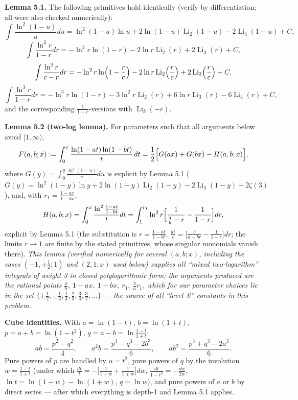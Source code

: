 \documentclass[11pt]{article}
\theoremstyle{remark}
\begin{document}
\textbf{Lemma 5.1.} The following primitives hold identically (verify by differentiation; all were also checked numerically):
\[
\int\frac{\ln^2(1-u)}{u}du=\ln^2(1-u)\ln u+2\ln(1-u)\operatorname{Li}_2(1-u)-2\operatorname{Li}_3(1-u)+C,
\]
\[
\int\frac{\ln^2 r}{1-r}dr=-\ln^2r\ln(1-r)-2\ln r\operatorname{Li}_2(r)+2\operatorname{Li}_3(r)+C,
\]
\[
\int\frac{\ln^2 r}{c-r}dr=-\ln^2r\ln\Bigl(1-\frac rc\Bigr)-2\ln r\operatorname{Li}_2\Bigl(\frac rc\Bigr)+2\operatorname{Li}_3\Bigl(\frac rc\Bigr)+C,
\]
\[
\int\frac{\ln^3 r}{1-r}dr=-\ln^3r\ln(1-r)-3\ln^2r\operatorname{Li}_2(r)+6\ln r\operatorname{Li}_3(r)-6\operatorname{Li}_4(r)+C,
\]
and the corresponding $\frac{1}{1+r}$-versions with $\operatorname{Li}_k(-r)$.

\textbf{Lemma 5.2 (two-log lemma).} For parameters such that all arguments below avoid $[1,\infty)$,
\[
F(a,b;x):=\int_0^x\frac{\ln(1-at)\ln(1-bt)}{t}\,dt
=\frac12\Bigl[G(ax)+G(bx)-H(a,b;x)\Bigr],
\]
where $G(y)=\int_0^y\frac{\ln^2(1-u)}{u}du$ is explicit by Lemma 5.1 ($G(y)=\ln^2(1-y)\ln y+2\ln(1-y)\operatorname{Li}_2(1-y)-2\operatorname{Li}_3(1-y)+2\zeta(3)$), and, with $r_1=\frac{1-ax}{1-bx}$,
\[
H(a,b;x)=\int_0^x\frac{\ln^2\frac{1-at}{1-bt}}{t}dt
=\int_1^{r_1}\ln^2r\Bigl[\frac{1}{\frac ab-r}-\frac{1}{1-r}\Bigr]dr,
\]
explicit by Lemma 5.1 (the substitution is $r=\frac{1-at}{1-bt}$, $\frac{dt}{t}=\bigl[\frac{b}{a-br}-\frac{1}{1-r}\bigr]dr$; the limits $r\to1$ are finite by the stated primitives, whose singular monomials vanish there).
\textit{This lemma (verified numerically for several $(a,b;x)$, including the cases $(-1,\pm\tfrac12;1)$ and $(2,1;x)$ used below) supplies all ``mixed two-logarithm'' integrals of weight 3 in closed polylogarithmic form; the arguments produced are the rational points $\frac ab,\ 1-ax,\ 1-bx,\ r_1,\ \tfrac ba r_1$, which for our parameter choices lie in the set $\{\pm\tfrac12,\pm\tfrac13,\tfrac14,\tfrac23,\tfrac34,\tfrac32,\dots\}$ --- the source of all ``level--6'' constants in this problem.}

\textbf{Cube identities.} With $a=\ln(1-t)$, $b=\ln(1+t)$, $p=a+b=\ln(1-t^2)$, $q=a-b=\ln\frac{1-t}{1+t}$:
\begin{equation*}
ab=\frac{p^2-q^2}{4},\qquad a^2b=\frac{p^3-q^3-2b^3}{6},\qquad ab^2=\frac{p^3+q^3-2a^3}{6}. \tag{5.1}
\end{equation*}
Pure powers of $p$ are handled by $u=t^2$, pure powers of $q$ by the involution $w=\frac{1-t}{1+t}$ (under which $\frac{dt}{t}=-\bigl[\frac1{1-w}+\frac1{1+w}\bigr]dw$, $\frac{dt}{1-t^2}=-\frac{dw}{2w}$, $\ln t=\ln(1-w)-\ln(1+w)$, $q=\ln w$), and pure powers of $a$ or $b$ by direct series --- after which everything is depth-1 and Lemma 5.1 applies.
\end{document}
